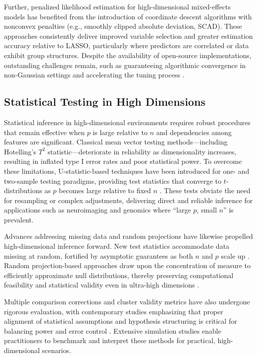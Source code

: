 \documentclass[sigconf]{acmart}
\begin{document}
Further, penalized likelihood estimation for high-dimensional mixed-effects models has benefited from the introduction of coordinate descent algorithms with nonconvex penalties (e.g., smoothly clipped absolute deviation, SCAD). These approaches consistently deliver improved variable selection and greater estimation accuracy relative to LASSO, particularly where predictors are correlated or data exhibit group structures. Despite the availability of open-source implementations, outstanding challenges remain, such as guaranteeing algorithmic convergence in non-Gaussian settings and accelerating the tuning process \cite{ref116}.

\subsection{Statistical Testing in High Dimensions}

Statistical inference in high-dimensional environments requires robust procedures that remain effective when $p$ is large relative to $n$ and dependencies among features are significant. Classical mean vector testing methods—including Hotelling’s $T^2$ statistic—deteriorate in reliability as dimensionality increases, resulting in inflated type I error rates and poor statistical power. To overcome these limitations, U-statistic-based techniques have been introduced for one- and two-sample testing paradigms, providing test statistics that converge to $t$-distributions as $p$ becomes large relative to fixed $n$ \cite{ref91}. These tests obviate the need for resampling or complex adjustments, delivering direct and reliable inference for applications such as neuroimaging and genomics where ``large $p$, small $n$'' is prevalent.

Advances addressing missing data and random projections have likewise propelled high-dimensional inference forward. New test statistics accommodate data missing at random, fortified by asymptotic guarantees as both $n$ and $p$ scale up \cite{ref94}. Random projection-based approaches draw upon the concentration of measure to efficiently approximate null distributions, thereby preserving computational feasibility and statistical validity even in ultra-high dimensions \cite{ref92,ref93}.

Multiple comparison corrections and cluster validity metrics have also undergone rigorous evaluation, with contemporary studies emphasizing that proper alignment of statistical assumptions and hypothesis structuring is critical for balancing power and error control \cite{ref95,ref110,ref113}. Extensive simulation studies enable practitioners to benchmark and interpret these methods for practical, high-dimensional scenarios.
\end{document}
